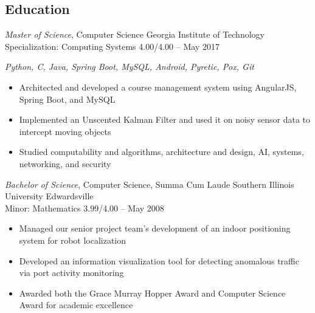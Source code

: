 \documentclass[margin,line]{resume}
\begin{document}
\begin{resume}
\section{Education}
{\small
  {\sl Master of Science}, Computer Science \hfill
  Georgia Institute of Technology\\
  Specialization: Computing Systems \hfill
  4.00/4.00 -- May 2017
}\\[2pt]
{\small\centering\textit{Python, C, Java, Spring Boot, MySQL, Android, Pyretic, Pox, Git}\par}\vspace*{-\baselineskip}
\vspace{2pt}
\begin{itemize} \itemsep -2pt %
\small\item Architected and developed a course management system using AngularJS, Spring Boot, and MySQL
\small\item Implemented an Unscented Kalman Filter and used it on noisy sensor data to intercept moving objects
\small\item Studied computability and algorithms, architecture and design, AI, systems, networking, and security
\end{itemize}\vspace{-\baselineskip} %
\vspace{2pt}
{\small
  {\sl Bachelor of Science}, Computer Science, Summa Cum Laude \hfill
  Southern Illinois University Edwardsville\\
  Minor: Mathematics \hfill
  3.99/4.00 -- May 2008
}
\begin{itemize} \itemsep -2pt %
\small\item Managed our senior project team's development of an indoor positioning system for robot localization
\small\item Developed an information visualization tool for detecting anomalous traffic via port activity monitoring
\small\item Awarded both the Grace Murray Hopper Award and Computer Science Award for academic excellence
\end{itemize}



\end{resume}
\end{document}
